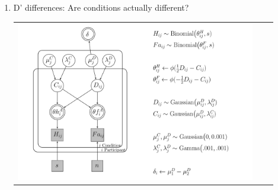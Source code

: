 \documentclass[final]{beamer}
\newlength{\sepwid}
\newlength{\onecolwid}
\newlength{\twocolwid}
\begin{document}
\begin{frame}[t]
\begin{columns}[t]
\begin{column}{\twocolwid}
\begin{columns}[t,totalwidth=\twocolwid]
\begin{column}{\onecolwid}
\begin{alertblock}{}

\end{alertblock}
\end{column} %

\setlength{\onecolwid}{0.21\paperwidth}
\begin{column}{\sepwid}\end{column} %
\begin{column}{\onecolwid}\vspace{-.6in} %




\begin{alertblock}{}


\begin{enumerate}
\item D' differences: Are conditions actually different?
\begin{center}
\begin{tabular}{ccc}
\includegraphics[width=0.65\linewidth]{Figures/Delta_DiffD_Model4.pdf}
\end{tabular}
\end{center}


\end{enumerate}
\end{alertblock}
\end{column}
\end{columns}
\end{column}
\end{columns}
\end{frame}
\end{document}
